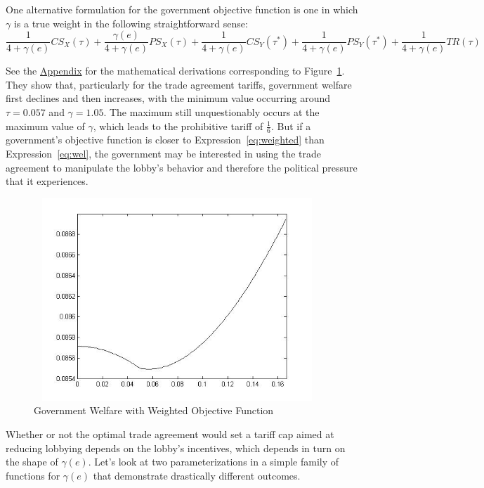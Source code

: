 \documentclass[12pt]{article}
\newcommand{\ga}{\gamma}
\begin{document}
One alternative formulation for the government objective function is one in which $\ga$ is a true weight in the following straightforward sense:
\begin{equation}
  \frac{1}{4+\ga(e)}CS_X(\tau) + \frac{\ga(e)}{4+\ga(e)}PS_X(\tau) + \frac{1}{4+\ga(e)}CS_Y(\tau^*) + \frac{1}{4+\ga(e)}PS_Y(\tau^*) + \frac{1}{4+\ga(e)}TR(\tau)
  \label{eq:weighted}
\end{equation}

See the \hyperlink{sol_weighted}{Appendix} for the mathematical derivations corresponding to Figure~\ref{fig:weight}. They show that, particularly for the trade agreement tariffs, government welfare first declines and then increases, with the minimum value occurring around $\tau = 0.057$ and $\ga = 1.05$. The maximum still unquestionably occurs at the maximum value of $\ga$, which leads to the prohibitive tariff of $\frac{1}{6}$. But if a government's objective function is closer to Expression~\ref{eq:weighted} than Expression~\ref{eq:wel}, the government may be interested in using the trade agreement to manipulate the lobby's behavior and therefore the political pressure that it experiences.
	
\begin{figure}
\begin{center}
\includegraphics[height=3in, width=4.25in]{weight.jpg}
\end{center}
\caption{Government Welfare with Weighted Objective Function \label{fig:weight}}
\end{figure}

Whether or not the optimal trade agreement would set a tariff cap aimed at reducing lobbying depends on the lobby's incentives, which depends in turn on the shape of $\ga(e)$. Let's look at two parameterizations in a simple family of functions for $\ga(e)$ that demonstrate drastically different outcomes.
\end{document}
